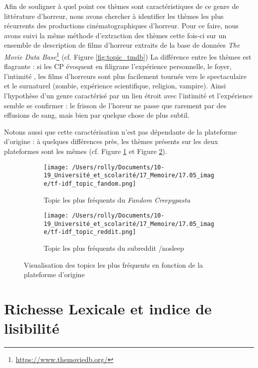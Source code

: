 \documentclass[12pt,a4paper,oneside,titlepage]{book} %
\begin{document}
	Afin de souligner à quel point ces thèmes sont caractéristiques de ce genre de littérature d'horreur, nous avons chercher à identifier les thèmes les plus récurrents des productions cinématographiques d'horreur.
	Pour ce faire, nous avons suivi la même méthode d'extraction des thèmes cette fois-ci sur un ensemble de description de films d'horreur extraits de la base de données \textit{The Movie Data Base}\footnote{\url{https://www.themoviedb.org/}} (cf. Figure \ref{fig:topic_tmdb})	
	La différence entre les thèmes est flagrante : si les CP évoquent en filigrane l'expérience personnelle, le foyer, l'intimité , les films d'horreurs sont plus facilement tournés vers le spectaculaire et le surnaturel (zombie, expérience scientifique, religion, vampire). 
	Ainsi l'hypothèse d'un genre caractérisé par un lien étroit avec l'intimité et l'expérience semble se confirmer : le frisson de l'horeur ne passe que rarement par des effusions de sang, mais bien par quelque chose de plus subtil.
	
	Notons aussi que cette caractérisation n'est pas dépendante de la plateforme d'origine : à quelques différences près, les thèmes présents sur les deux plateformes sont les mêmes (cf. Figure \ref{fig:topic_CP} et Figure \ref{fig:topic_reddit}). 
	
	
	

	
		
		\begin{figure}[htbp]
			\centering
			\begin{subfigure}[b]{0.45\textwidth}
				\texttt{[image: /Users/rolly/Documents/10-19\_Université\_et\_scolarité/17\_Memoire/17.05\_image/tf-idf\_topic\_fandom.png]}
				\caption{Topic les plus fréquents du \emph{Fandom Creepypasta}}
				\label{fig:topic_CP}
			\end{subfigure}
			\hfill
			\begin{subfigure}[b]{0.45\textwidth}
				\texttt{[image: /Users/rolly/Documents/10-19\_Université\_et\_scolarité/17\_Memoire/17.05\_image/tf-idf\_topic\_reddit.png]}
				\caption{Topic les plus fréquents du subreddit /nosleep}
				\label{fig:topic_reddit}
			\end{subfigure}
			\caption{Visualisation des topics les plus fréquents en fonction de la plateforme d'origine}
			\label{fig:topics_plateforme}
		\end{figure}
		

	\section{Richesse Lexicale et indice de lisibilité}
	
\end{document}
